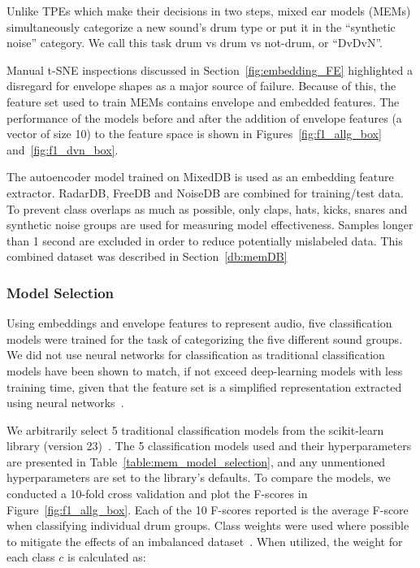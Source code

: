 \documentclass[\main/thesis.tex]{subfiles}
\begin{document}
Unlike TPEs which make their decisions in two steps, mixed ear models (MEMs) simultaneously categorize a new sound's drum type or put it in the \enquote{synthetic noise} category. We call this task drum vs drum vs not-drum, or \enquote{DvDvN}.

Manual t-SNE inspections discussed in Section~\ref{fig:embedding_FE} highlighted a disregard for envelope shapes as a major source of failure. Because of this, the feature set used to train MEMs contains envelope and embedded features. The performance of the models before and after the addition of envelope features (a vector of size 10) to the feature space is shown in Figures~\ref{fig:f1_allg_box} and~\ref{fig:f1_dvn_box}.

The autoencoder model trained on MixedDB is used as an embedding feature extractor. RadarDB, FreeDB and NoiseDB are combined for training/test data. To prevent class overlaps as much as possible, only claps, hats, kicks, snares and synthetic noise groups are used for measuring model effectiveness. Samples longer than 1 second are excluded in order to reduce potentially mislabeled data. This combined dataset was described in Section~\ref{db:memDB}


\subsubsection{Model Selection}
Using embeddings and envelope features to represent audio, five classification models were trained for the task of categorizing the five different sound groups. We did not use neural networks for classification as traditional classification models have been shown to match, if not exceed deep-learning models with less training time, given that the feature set is a simplified representation extracted using neural networks~\cite{notley2018examining}.

 We arbitrarily select 5 traditional classification models from the scikit-learn library (version 23)~\cite{pedregosa2011scikit}. The 5 classification models used and their hyperparameters are presented in Table~\ref{table:mem_model_selection}, and any unmentioned hyperparameters are set to the library's defaults. To compare the models, we conducted a 10-fold cross validation and plot the F-scores in Figure~\ref{fig:f1_allg_box}. Each of the 10 F-scores reported is the average F-score when classifying individual drum groups. Class weights were used where possible to mitigate the effects of an imbalanced dataset~\cite{provost2000machine,chawla2004special}. When utilized, the weight for each class $c$ is calculated as:
\end{document}

